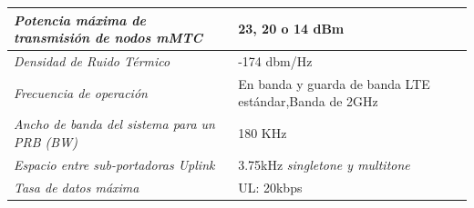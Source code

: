 \begin{table}
\begin{tabular}{|m{6cm}|p{10cm}|}
    \textit{Potencia máxima de transmisión de nodos mMTC } & \footnotesize{ 23, 20 o 14 dBm } \\ \hline 
    \textit{Densidad de Ruido Térmico} & \footnotesize{ -174 dbm/Hz } \\ \hline 
    \textit{Frecuencia de operación}  & \footnotesize{ En banda y guarda de banda LTE estándar,\newline Banda de 2GHz } \\ \hline 
    \textit{Ancho de banda del sistema para un PRB (BW) } & \footnotesize{ 180 KHz } \\ \hline 
    \textit{Espacio entre sub-portadoras Uplink}  & \footnotesize{ 3.75kHz \textit{singletone y multitone} \parencite{Shahini2019}} \\ \hline 
    \textit{Tasa de datos máxima} & \footnotesize{ UL: 20kbps} \\  
    \end{tabular}
\end{table}

